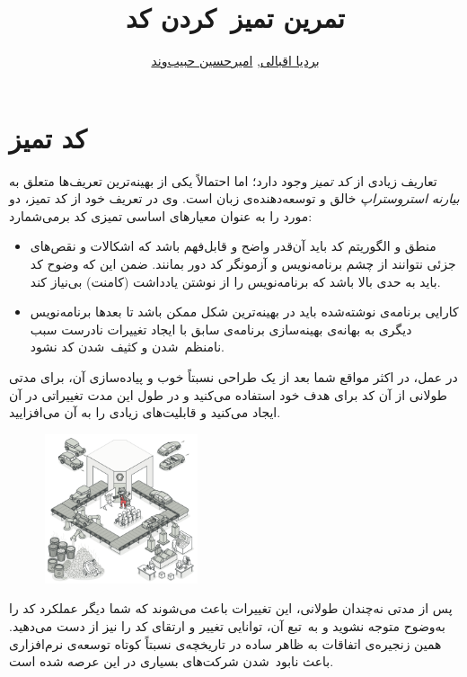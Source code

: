 \documentclass{utap}
\title{تمرین  تمیز~کردن کد}
\author{
    \href{mailto:bardia.eghbali@gmail.com?subject=[AP\%20S98\%20Refactoring]\%20}{بردیا اقبالی},
    \href{mailto:ahhabibvand@gmail.com?subject=[AP\%20S98\%20Refactoring]\%20}{امیرحسین حبیب‌وند}
}
\begin{document}
\maketitle

\section{کد تمیز}
تعاریف زیادی از
\textit{کد تمیز}
وجود دارد؛ اما احتمالاً یکی از بهینه‌ترین تعریف‌ها متعلق به
\textit{بیارنه استروستراپ}
خالق و توسعه‌دهنده‌ی زبان  است. وی در تعریف خود از کد تمیز، دو مورد را به عنوان معیار‌های اساسی تمیزی کد برمی‌شمارد:
\begin{itemize}
\item
منطق و الگوریتم کد باید آن‌قدر واضح و قابل‌فهم باشد که اشکالات و نقص‌های ﺟﺰﺋﯽ نتوانند از چشم برنامه‌نویس و آزمونگر کد دور بمانند. ضمن این که وضوح کد باید به حدی بالا باشد که برنامه‌نویس را از نوشتن یادداشت (کامنت) بی‌نیاز کند.

\item
کارایی
برنامه‌ی نوشته‌شده باید در بهینه‌ترین
شکل ممکن باشد تا بعدها برنامه‌نویس دیگری به بهانه‌ی بهینه‌سازی
برنامه‌ی سابق با ایجاد تغییرات نادرست سبب نامنظم~شدن و کثیف~شدن کد نشود.
\end{itemize}

در عمل، در اکثر مواقع شما بعد از یک طراحی نسبتاً خوب و پیاده‌سازی آن، برای مدتی طولانی از آن کد برای هدف خود استفاده می‌کنید و در طول این مدت تغییراتی در آن ایجاد می‌کنید و قابلیت‌های زیادی را به آن می‌افزایید.

\begin{figure}
    \centering
    \includegraphics[width=0.4\textwidth]{refactoring}
\end{figure}

پس از مدتی نه‌چندان طولانی، این تغییرات باعث می‌شوند که شما دیگر عملکرد کد را به‌وضوح متوجه نشوید و به~تبع آن، توانایی تغییر و ارتقای کد را نیز از دست می‌دهید. همین زنجیره‌ی اتفاقات به ظاهر ساده در تاریخچه‌ی نسبتاً کوتاه توسعه‌ی نرم‌افزاری باعث نابود~شدن شرکت‌های بسیاری در این عرصه شده است.
\end{document}
